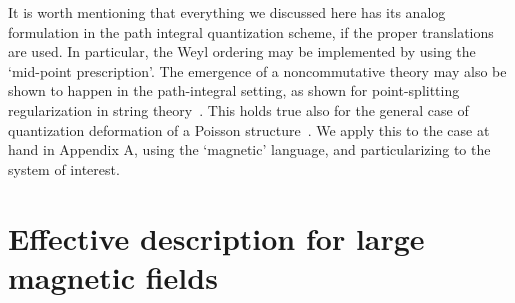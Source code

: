 \documentclass[a4paper,12pt]{article}
\begin{document}
It is worth mentioning that everything we discussed here has its
analog formulation in the path integral quantization scheme, if the
proper translations are used. In particular, the Weyl ordering may
be
implemented by using the `mid-point prescription'.  The emergence
of a
noncommutative theory may also be shown to happen in the
path-integral
setting, as shown for point-splitting regularization in string
theory~\cite{SW}. This holds true also for the general case of
quantization deformation of a Poisson structure~\cite{cattaneo}. We
apply this to the case at hand in Appendix A, using the `magnetic'
language, and particularizing to the system of interest.


\section{Effective description for large magnetic fields}
\label{sec:eff}
 
\end{document}
